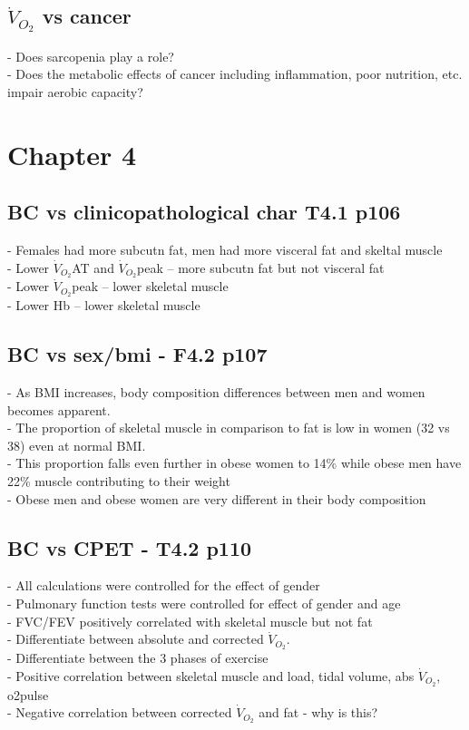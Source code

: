 \documentclass[12pt,a4paper]{article}
\begin{document}
\subsection{$\dot{V}_{O_2}$ vs cancer}
- Does sarcopenia play a role?\\
- Does the metabolic effects of cancer including inflammation, poor nutrition, etc. impair aerobic capacity?

\clearpage

\section{Chapter 4}

\subsection{BC vs clinicopathological char T4.1 p106}

- Females had more subcutn fat, men had more visceral fat and skeltal muscle\\
- Lower $\dot{V}_{O_2}$AT and $\dot{V}_{O_2}$peak -- more subcutn fat but not visceral fat\\
- Lower $\dot{V}_{O_2}$peak -- lower skeletal muscle\\
- Lower Hb -- lower skeletal muscle

\subsection{BC vs sex/bmi - F4.2 p107}

- As BMI increases, body composition differences between men and women becomes apparent.\\
- The proportion of skeletal muscle in comparison to fat is low in women (32 vs 38) even at normal BMI. \\
- This proportion falls even further in obese women to 14\% while obese men have 22\% muscle contributing to their weight\\
- Obese men and obese women are very different in their body composition

\subsection{BC vs CPET - T4.2 p110}

- All calculations were controlled for the effect of gender\\
- Pulmonary function tests were controlled for effect of gender and age\\
- FVC/FEV positively correlated with skeletal muscle but not fat\\
- Differentiate between absolute and corrected $\dot{V}_{O_2}$.\\
- Differentiate between the 3 phases of exercise\\
- Positive correlation between skeletal muscle and load, tidal volume, abs $\dot{V}_{O_2}$, o2pulse\\
- Negative correlation between corrected $\dot{V}_{O_2}$ and fat - why is this?
\end{document}
